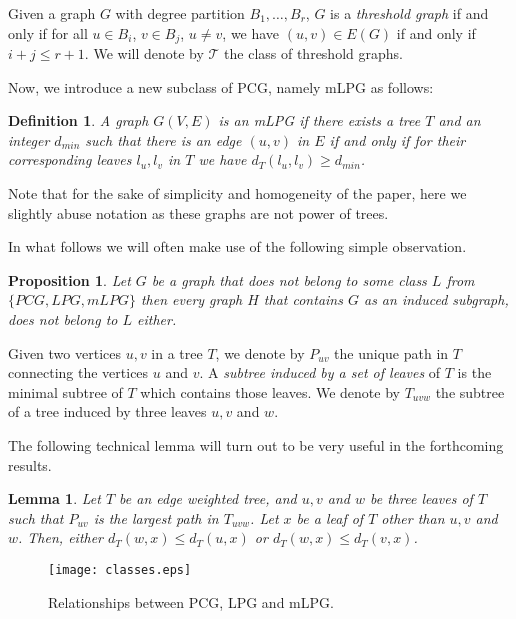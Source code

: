 \documentclass[dvipdfm]{llncs}
\newtheorem{Proposition}{Proposition}
\newtheorem{Lemma}{Lemma}
\newtheorem{Definition}{Definition}
\newcommand{\dmin}{d_{min}}
\begin{document}
Given a graph $G$ with  degree partition $B_1, \ldots, B_r$, $G$ is a  {\em threshold graph} if and only if for all $u \in B_i$, $v \in B_j$, $u \neq v$, we have $(u,v) \in E(G)$ if and only if $i+j \leq r+1$. We will denote by $\mathcal{T}$ the class of threshold graphs. 


\smallskip

Now, we introduce a new subclass of PCG, namely mLPG as follows: 

\begin{Definition}
A graph $G(V,E)$ is an mLPG if there exists a tree $T$ and an integer $\dmin$ such that there is an edge $(u,v)$ in $E$ if and only if for their corresponding leaves $l_u, l_v$ in $T$ we have $d_T(l_u, l_v) \geq \dmin$. 
\end{Definition}
Note that for the sake of simplicity and homogeneity of the paper, here we slightly abuse notation as these graphs are not power of trees.


\medskip
\noindent
In what follows we will often make use of the following simple observation.

\begin{Proposition}\label{prop:technical}
Let $G$ be a  graph that does not belong to some class $L$ from $\{PCG, LPG, mLPG\}$ then every graph $H$ that contains $G$ as an induced subgraph, does not belong to $L$ either.
\end{Proposition}


Given two vertices $u,v$ in a tree $T$, we denote by $P_{uv}$ the unique path in $T$ connecting the vertices $u$ and $v$. A {\em subtree induced by a set of leaves} of $T$ is the minimal subtree of $T$ which contains those leaves. We denote by $T_{uvw}$ the subtree of a tree induced by three leaves $u, v$ and $w$. 

The following technical lemma will turn out to be very useful in the forthcoming results.

\begin{Lemma}\label{lem:technical} \cite{YBR10}
Let $T$ be an edge weighted tree, and $u, v$ and $w$ be three leaves of $T$
such that $P_{uv}$ is the largest path in $T_{uvw}$. Let $x$ be a leaf of $T$ other than $u, v$ and
$w$. Then, either $d_T(w, x) \leq d_T (u, x)$ or $d_T(w, x)\leq d_T(v, x)$.
\end{Lemma}


\begin{figure}[h]
	\centering
	\texttt{[image: classes.eps]}
\caption{Relationships between PCG, LPG and mLPG.}
\label{fig:classes}
\end{figure}
\end{document}
